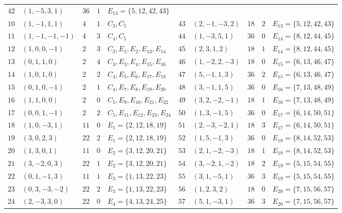 \documentclass[aps,pra,reprint,superscriptaddress,longbibliography,nofootinbib,floatfix,10pt]{revtex4-2}
\theoremstyle{definition}
\begin{document}
\begin{longtable}{rllll|rllll}
$42$ & $(1,-5,3,1)$    & $36$ & $1$ & $E_{13}=\{5,12,42,43\}$ \\
$10$ & $(1,-1,1,1)$    & $4$  & $1$ & $C_3,C_5$ &
$43$ & $(2,-1,-3,2)$   & $18$ & $2$ & $E_{13}=\{5,12,42,43\}$ \\
$11$ & $(1,-1,-1,-1)$  & $4$  & $3$ & $C_4,C_5$ &
$44$ & $(1,-3,5,1)$    & $36$ & $0$ & $E_{14}=\{8,12,44,45\}$ \\
$12$ & $(1,0,0,-1)$    & $2$  & $3$ & $C_3,E_1,E_2,E_{13},E_{14}$ &
$45$ & $(2,3,1,2)$     & $18$ & $1$ & $E_{14}=\{8,12,44,45\}$ \\
$13$ & $(0,1,1,0)$     & $2$  & $4$ & $C_3,E_3,E_4,E_{15},E_{16}$ &
$46$ & $(1,-2,2,-3)$   & $18$ & $0$ & $E_{15}=\{6,13,46,47\}$ \\
$14$ & $(1,0,1,0)$     & $2$  & $2$ & $C_4,E_5,E_6,E_{17},E_{18}$ &
$47$ & $(5,-1,1,3)$    & $36$ & $2$ & $E_{15}=\{6,13,46,47\}$ \\
$15$ & $(0,1,0,-1)$    & $2$  & $1$ & $C_4,E_7,E_8,E_{19},E_{20}$ &
$48$ & $(3,-1,1,5)$    & $36$ & $0$ & $E_{16}=\{7,13,48,49\}$ \\
$16$ & $(1,1,0,0)$     & $2$  & $0$ & $C_5,E_9,E_{10},E_{21},E_{22}$ &
$49$ & $(3,2,-2,-1)$   & $18$ & $1$ & $E_{16}=\{7,13,48,49\}$ \\
$17$ & $(0,0,1,-1)$    & $2$  & $2$ & $C_5,E_{11},E_{12},E_{23},E_{24}$ &
$50$ & $(1,3,-1,5)$    & $36$ & $0$ & $E_{17}=\{6,14,50,51\}$ \\
$18$ & $(1,0,-3,1)$    & $11$ & $0$ & $E_1=\{2,12,18,19\}$ &
$51$ & $(2,-3,-2,1)$   & $18$ & $3$ & $E_{17}=\{6,14,50,51\}$ \\
$19$ & $(3,0,2,3)$     & $22$ & $2$ & $E_1=\{2,12,18,19\}$ &
$52$ & $(1,5,-1,3)$    & $36$ & $0$ & $E_{18}=\{8,14,52,53\}$ \\
$20$ & $(1,3,0,1)$     & $11$ & $0$ & $E_2=\{3,12,20,21\}$ &
$53$ & $(2,1,-2,-3)$   & $18$ & $1$ & $E_{18}=\{8,14,52,53\}$ \\
$21$ & $(3,-2,0,3)$    & $22$ & $1$ & $E_2=\{3,12,20,21\}$ &
$54$ & $(3,-2,1,-2)$   & $18$ & $2$ & $E_{19}=\{5,15,54,55\}$ \\
$22$ & $(0,1,-1,3)$    & $11$ & $1$ & $E_3=\{1,13,22,23\}$ &
$55$ & $(3,1,-5,1)$    & $36$ & $3$ & $E_{19}=\{5,15,54,55\}$ \\
$23$ & $(0,3,-3,-2)$   & $22$ & $2$ & $E_3=\{1,13,22,23\}$ &
$56$ & $(1,2,3,2)$     & $18$ & $0$ & $E_{20}=\{7,15,56,57\}$ \\
$24$ & $(2,-3,3,0)$    & $22$ & $0$ & $E_4=\{4,13,24,25\}$ &
$57$ & $(5,1,-3,1)$    & $36$ & $3$ & $E_{20}=\{7,15,56,57\}$ \\

\end{longtable}
\end{document}
